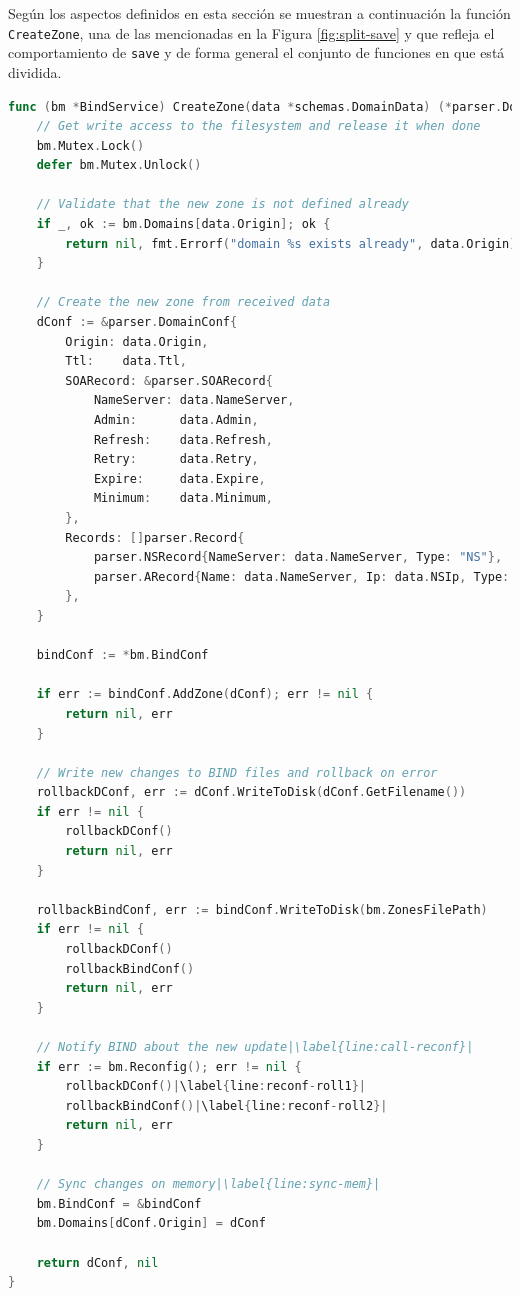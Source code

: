 Según los aspectos definidos en esta sección se muestran a continuación la función \verb|CreateZone|, una de las mencionadas en la Figura \ref{fig:split-save} y que refleja el comportamiento de \verb|save| y de forma general el conjunto de funciones en que está dividida.

\label{func:create-zone}
\begin{lstlisting}[frame=single, language=Go, escapechar=|, caption=Ejemplo de la función que añade una nueva zona al servidor DNS.]
func (bm *BindService) CreateZone(data *schemas.DomainData) (*parser.DomainConf, error) {
    // Get write access to the filesystem and release it when done
    bm.Mutex.Lock()
    defer bm.Mutex.Unlock()

    // Validate that the new zone is not defined already 
    if _, ok := bm.Domains[data.Origin]; ok {
        return nil, fmt.Errorf("domain %s exists already", data.Origin)
    }

    // Create the new zone from received data
    dConf := &parser.DomainConf{
        Origin: data.Origin,
        Ttl:    data.Ttl,
        SOARecord: &parser.SOARecord{
            NameServer: data.NameServer,
            Admin:      data.Admin,
            Refresh:    data.Refresh,
            Retry:      data.Retry,
            Expire:     data.Expire,
            Minimum:    data.Minimum,
        },
        Records: []parser.Record{
            parser.NSRecord{NameServer: data.NameServer, Type: "NS"},
            parser.ARecord{Name: data.NameServer, Ip: data.NSIp, Type: "A"},
        },
    }

	bindConf := *bm.BindConf

	if err := bindConf.AddZone(dConf); err != nil {
		return nil, err
	}

    // Write new changes to BIND files and rollback on error
	rollbackDConf, err := dConf.WriteToDisk(dConf.GetFilename())
	if err != nil {
		rollbackDConf()
		return nil, err
	}

	rollbackBindConf, err := bindConf.WriteToDisk(bm.ZonesFilePath)
	if err != nil {
		rollbackDConf()
		rollbackBindConf()
		return nil, err
	}

    // Notify BIND about the new update|\label{line:call-reconf}|
	if err := bm.Reconfig(); err != nil {
		rollbackDConf()|\label{line:reconf-roll1}|
		rollbackBindConf()|\label{line:reconf-roll2}|
		return nil, err
	}

    // Sync changes on memory|\label{line:sync-mem}|
	bm.BindConf = &bindConf
	bm.Domains[dConf.Origin] = dConf

	return dConf, nil
}
\end{lstlisting}

